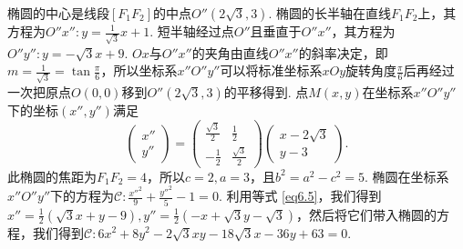 \begin{solution}
  \begin{inparaenum}[(a)]
    \item 椭圆的中心是线段$[F_1F_2]$的中点$O''(2\sqrt3,3)$. 椭圆的长半轴在直线$F_1F_2$上，其方程为$O''x'':y=\frac1{\sqrt3}x+1$. 短半轴经过点$O''$且垂直于$O''x''$，其方程为$O''y'':y=-\sqrt3x+9$. $Ox$与$O''x''$的夹角由直线$O''x''$的斜率决定，即$m=\frac1{\sqrt3}=\tan\frac\pi6$，所以坐标系$x''O''y''$可以将标准坐标系$xOy$旋转角度$\frac\pi6$后再经过一次把原点$O(0,0)$移到$O''(2\sqrt3,3)$的平移得到. 点$M(x,y)$在坐标系$x''O''y''$下的坐标$(x'',y'')$满足
        \begin{equation}\label{eq6.5}
          \begin{pmatrix}
            x'' \\
            y''
          \end{pmatrix} =
          \begin{pmatrix}
            \frac{\sqrt3}2 & \frac12 \\
            -\frac12 & \frac{\sqrt3}2
          \end{pmatrix}
          \begin{pmatrix}
            x - 2\sqrt 3\\
            y - 3
          \end{pmatrix}.
        \end{equation}
    此椭圆的焦距为$F_1F_2=4$，所以$c=2,a=3$，且$b^2=a^2-c^2=5$. 椭圆在坐标系$x''O''y''$下的方程为$\mathscr C:\frac{x''^2}9+\frac{y''^2}5-1=0$. 利用等式 \eqref{eq6.5}，我们得到$x''=\frac12(\sqrt3x+y-9),
    y''=\frac12(-x+\sqrt3y-\sqrt3)$，然后将它们带入椭圆的方程，我们得到$\mathscr C:6x^2+8y^2-2\sqrt3xy-18\sqrt3x-36y+63=0$.


\end{inparaenum}
\end{solution}
